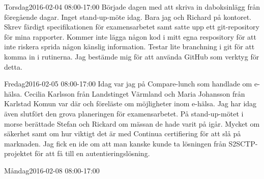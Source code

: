 \documentclass[a4paper,oneside]{book}
\begin{document}
\begin{diary}{Torsdag}{2016-02-04 08:00-17:00}
	Började dagen med att skriva in daboksinlägg från föregående dagar. Inget stand-up-möte idag. Bara jag och Richard på kontoret. Skrev färdigt specifikationen för examensarbetet samt satte upp ett git-repository för mina rapporter. Kommer inte lägga någon kod i mitt egna respository för att inte riskera sprida någon känslig information. Testar lite branchning i git för att komma in i rutinerna. Jag bestämde mig för att använda GitHub som verktyg för detta.
\end{diary}

\begin{diary}{Fredag}{2016-02-05 08:00-17:00}
	Idag var jag på Compare-lunch som handlade om e-hälsa. Cecilia Karlsson från Landstinget Värmland och Maria Johansson från Karlstad Komun var där och föreläste om möjligheter inom e-hälsa. Jag har idag även slutfört den grova planeringen för examensarbetet. På stand-up-mötet i morse berättade Stefan och Rickard om mässan de hade varit på igår. Mycket om säkerhet samt om hur viktigt det är med Continua certifiering för att slå på marknaden. Jag fick en ide om att man kanske kunde ta lösningen från S2SCTP-projektet för att få till en autentieringslösning.
\end{diary}
\newpage

\begin{diary}{Måndag}{2016-02-08 08:00-17:00}
\lipsum[1]
\end{diary}
\end{document}
